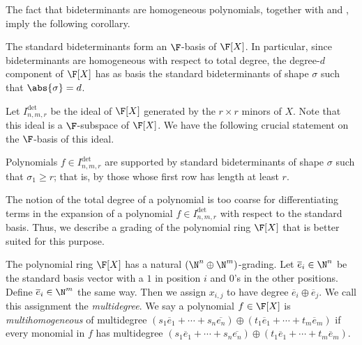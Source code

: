 \documentclass[letterpaper, 11pt]{amsart}
\begin{document}
The fact that bideterminants are homogeneous polynomials, together with  and , imply the following corollary.
\begin{cor}\label{cor:det-basis}
The standard bideterminants form an $\F$-basis of $\F[X]$.
In particular, since bideterminants are homogeneous with respect to total degree, the degree-$d$ component of $\F[X]$ has as basis the standard bideterminants of shape $\sigma$ such that $\abs{\sigma} = d$.
\end{cor}

Let $I^{\det}_{n, m, r}$ be the ideal of $\F[X]$ generated by the $r \times r$ minors of $X$.
Note that this ideal is a $\F$-subspace of $\F[X]$.
We have the following crucial statement on the $\F$-basis of this ideal.
\begin{prop}[{\cite[Corollary 1.7]{BC03}}]\label{prop:det_shape}
    Polynomials $f \in I^{\det}_{n, m, r}$ are supported by standard bideterminants of shape $\sigma$ such that $\sigma_1 \geq r$; that is, by those whose first row has length at least $r$.
\end{prop}

The notion of the total degree of a polynomial is too coarse for differentiating terms in the expansion of a polynomial $f \in I^{\det}_{n, m, r}$ with respect to the standard basis.
Thus, we describe a grading of the polynomial ring $\F[X]$ that is better suited for this purpose.
\begin{defn}\label{defn:multideg}
    The polynomial ring $\F[X]$ has a natural $(\N^n \oplus \N^m)$-grading.
    Let $\overline{e}_i \in \N^n$ be the standard basis vector with a $1$ in position $i$ and $0$'s in the other positions.
    Define $\overline{e}_i \in \N^m$ the same way.
    Then we assign $x_{i, j}$ to have degree $\overline{e}_i \oplus \overline{e}_j$.
    We call this assignment the \emph{multidegree}.
    We say a polynomial $f \in \F[X]$ is \emph{multihomogeneous} of multidegree $(s_1 \overline{e}_1 + \cdots + s_n \overline{e_n}) \oplus (t_1 \overline{e}_1 + \cdots + t_m \overline{e}_m)$ if every monomial in $f$ has multidegree $(s_1 \overline{e}_1 + \cdots + s_n \overline{e_n}) \oplus (t_1 \overline{e}_1 + \cdots + t_m \overline{e}_m)$.
\end{defn} 
\end{document}
